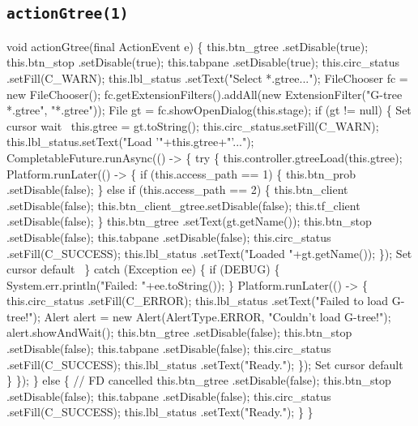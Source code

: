 \subsection{\texttt{actionGtree(1)}}
\nwenddocs{}\endmoddef{}
void actionGtree(final ActionEvent e) \{
  this.btn_gtree    .setDisable(true);
  this.btn_stop     .setDisable(true);
  this.tabpane      .setDisable(true);
  this.circ_status  .setFill(C_WARN);
  this.lbl_status   .setText("Select *.gtree...");
  FileChooser fc = new FileChooser();
  fc.getExtensionFilters().addAll(new ExtensionFilter("G-tree *.gtree", "*.gtree"));
  File gt = fc.showOpenDialog(this.stage);
  if (gt != null) \{
    \LA{}Set cursor wait~{\nwtagstyle{}}\RA{}
    this.gtree = gt.toString();
    this.circ_status.setFill(C_WARN);
    this.lbl_status.setText("Load '"+this.gtree+"'...");
    CompletableFuture.runAsync(() -> \{
      try \{
        this.controller.gtreeLoad(this.gtree);
        Platform.runLater(() -> \{
          if (this.access_path == 1) \{
            this.btn_prob   .setDisable(false);
          \} else if (this.access_path == 2) \{
            this.btn_client .setDisable(false);
            this.btn_client_gtree.setDisable(false);
            this.tf_client  .setDisable(false);
          \}
          this.btn_gtree    .setText(gt.getName());
          this.btn_stop     .setDisable(false);
          this.tabpane      .setDisable(false);
          this.circ_status  .setFill(C_SUCCESS);
          this.lbl_status   .setText("Loaded "+gt.getName());
        \});
        \LA{}Set cursor default~{\nwtagstyle{}}\RA{}
      \} catch (Exception ee) \{
        if (DEBUG) \{
          System.err.println("Failed: "+ee.toString());
        \}
        Platform.runLater(() -> \{
          this.circ_status  .setFill(C_ERROR);
          this.lbl_status   .setText("Failed to load G-tree!");
          Alert alert = new Alert(AlertType.ERROR, "Couldn't load G-tree!");
          alert.showAndWait();
          this.btn_gtree    .setDisable(false);
          this.btn_stop     .setDisable(false);
          this.tabpane      .setDisable(false);
          this.circ_status  .setFill(C_SUCCESS);
          this.lbl_status   .setText("Ready.");
        \});
        \LA{}Set cursor default~{\nwtagstyle{}}\RA{}
      \}
    \});
  \} else \{
    // FD cancelled
    this.btn_gtree    .setDisable(false);
    this.btn_stop     .setDisable(false);
    this.tabpane      .setDisable(false);
    this.circ_status  .setFill(C_SUCCESS);
    this.lbl_status   .setText("Ready.");
  \}
\}
\eatline
{}\nwendcode{}\nwdocspar
